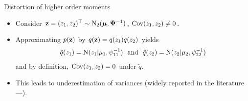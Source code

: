 \begin{frame}{Distortion of higher order moments}
  \vspace{-11pt}
  \begin{figure}[t]
    \centering\hspace{-16pt}
  \end{figure}
  \vspace{-10pt}
  \begin{itemize}[<+->]
    \item Consider ${\mathbf z} = (z_{1}, z_{2})^\top \sim \operatorname{N}_2( {\bm\mu}, {\bm\Psi}^{-1})$, $\operatorname{Cov}(z_1,z_2) \neq 0$.
    \item Approximating $p({\mathbf z})$ by $q({\mathbf z}) = q(z_1)q(z_2)$ yields
    \[
      \tilde q(z_1) = \N(z_1|\mu_1,\psi_{11}^{-1}) \ \text{ and } \ \tilde q(z_2) = \N(z_2|\mu_2,\psi_{22}^{-1})
    \]
    and by definition, $\operatorname{Cov}(z_1,z_2) = 0$ under $\tilde q$.
    \item This leads to underestimation of variances (widely reported in the literature---\cite{zhao2013}).
  \end{itemize}
\end{frame}

